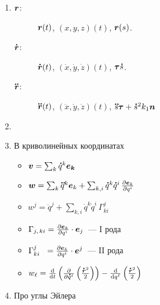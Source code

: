 \documentclass[draft,landscape,timbord]{notes}
\begin{document}
\begin{multicols*}{4} \raggedright
\begin{enumerate}
  \item 
    \begin{description}
      \item[$\v r$:] $\v r(t)$, $(x,y,z)(t)$, $\v r(s)$.
      \item[$\dot{\v r}$:] $\dot{\v r}(t)$, $(\dot x,\dot y,\dot z)(t)$, $\v\tau \dot s$.
      \item[$\ddot{\v r}$:] $\ddot{\v r}(t)$, $(\ddot x,\ddot y,\ddot z)(t)$,
        $\ddot s \v \tau + \dot s^2 k_1 \v n$
    \end{description}
  \item \quest
  \item В криволинейных координатах
    \begin{itemize}[$\triangleright$]
      \item $\v v = \sum_k \dot q^k \v {e_k}$
      \item $\v w = \sum_k \ddot q^k \v e_k + \sum_{k,i} \dot q^k \dot q^i \, \pder{\v e_k}{q^i}$
      \item ${w^j} = \ddot q^j + \sum_{k,i} \dot q^k \dot q^i \, \Gamma_{ki}^j$
      \item $ \Gamma_{j,\,ki} = \pder{\v e_k }{q^i}\cdot \v e_j$~--- I рода
      \item $ \Gamma_{ki}^j \;\,\,= \pder{\v e_k }{q^i}\cdot \v e^j$~--- II рода
      \item $w_\ell = 
        \fder{}{t} \left(\pder{}{\dot q^\ell}\left(\frac{\dot{\v r}^2}{2}\right)\right) 
        - \fder{}{q^\ell} \left(\frac{\dot{\v r}^2}{2}\right)$
    \end{itemize}
  \item Про углы Эйлера \\
    \noindent

\end{enumerate}
\end{multicols*}
\end{document}
